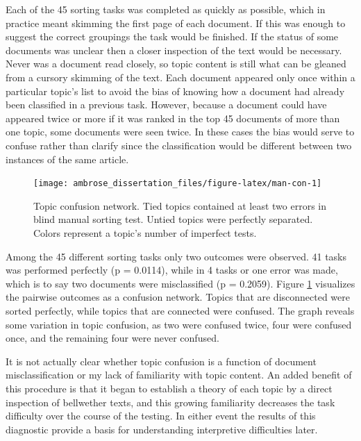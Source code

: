 \documentclass[]{book}
\theoremstyle{definition}
\theoremstyle{definition}
\theoremstyle{definition}
\theoremstyle{remark}
\begin{document}
Each of the 45 sorting tasks was completed as quickly as possible, which
in practice meant skimming the first page of each document. If this was
enough to suggest the correct groupings the task would be finished. If
the status of some documents was unclear then a closer inspection of the
text would be necessary. Never was a document read closely, so topic
content is still what can be gleaned from a cursory skimming of the
text. Each document appeared only once within a particular topic's list
to avoid the bias of knowing how a document had already been classified
in a previous task. However, because a document could have appeared
twice or more if it was ranked in the top 45 documents of more than one
topic, some documents were seen twice. In these cases the bias would
serve to confuse rather than clarify since the classification would be
different between two instances of the same article.

\begin{figure}

{\centering \texttt{[image: ambrose\_dissertation\_files/figure-latex/man-con-1]} 

}

\caption{Topic confusion network. Tied topics contained at least two errors in blind manual sorting test. Untied topics were perfectly separated. Colors represent a topic's number of imperfect tests.}\label{fig:man-con}
\end{figure}

Among the 45 different sorting tasks only two outcomes were observed. 41
tasks was performed perfectly (p = 0.0114), while in 4 tasks or one
error was made, which is to say two documents were misclassified (p =
0.2059). Figure \ref{fig:man-con} visualizes the pairwise outcomes as a
confusion network. Topics that are disconnected were sorted perfectly,
while topics that are connected were confused. The graph reveals some
variation in topic confusion, as two were confused twice, four were
confused once, and the remaining four were never confused.

It is not actually clear whether topic confusion is a function of
document misclassification or my lack of familiarity with topic content.
An added benefit of this procedure is that it began to establish a
theory of each topic by a direct inspection of bellwether texts, and
this growing familiarity decreases the task difficulty over the course
of the testing. In either event the results of this diagnostic provide a
basis for understanding interpretive difficulties later.
\end{document}
